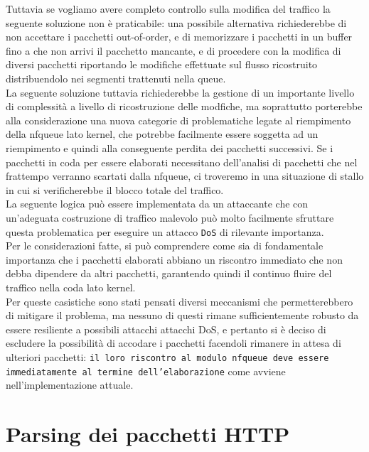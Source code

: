 Tuttavia se vogliamo avere completo controllo sulla modifica del traffico la seguente soluzione non è praticabile: una possibile alternativa richiederebbe
di non accettare i pacchetti out-of-order, e di memorizzare i pacchetti in un buffer fino a che non arrivi il pacchetto mancante, e di procedere con la modifica
di diversi pacchetti riportando le modifiche effettuate sul flusso ricostruito distribuendolo nei segmenti trattenuti nella queue.\\
La seguente soluzione tuttavia richiederebbe la gestione di un importante livello di complessità a livello di ricostruzione delle modfiche, ma soprattutto
porterebbe alla considerazione una nuova categorie di problematiche legate al riempimento della nfqueue lato kernel, che potrebbe facilmente essere soggetta
ad un riempimento e quindi alla conseguente perdita dei pacchetti successivi. Se i pacchetti in coda per essere elaborati necessitano dell'analisi di pacchetti che nel
frattempo verranno scartati dalla nfqueue, ci troveremo in una situazione di stallo in cui si verificherebbe il blocco totale del traffico.\\
La seguente logica può essere implementata da un attaccante che con un'adeguata costruzione di traffico malevolo può molto facilmente
sfruttare questa problematica per eseguire un attacco \texttt{DoS} di rilevante importanza.\\
Per le considerazioni fatte, si può comprendere come sia di fondamentale importanza che i pacchetti elaborati abbiano un riscontro immediato che non
debba dipendere da altri pacchetti, garantendo quindi il continuo fluire del traffico nella coda lato kernel.\\

Per queste casistiche sono stati pensati diversi meccanismi che permetterebbero di mitigare il problema, ma nessuno di questi rimane
sufficientemente robusto da essere resiliente a possibili attacchi attacchi DoS, e pertanto si è deciso di escludere la possibilità
di accodare i pacchetti facendoli rimanere in attesa di ulteriori pacchetti: \texttt{il loro riscontro al modulo nfqueue deve essere immediatamente al termine dell'elaborazione}
come avviene nell'implementazione attuale.\\

\section{Parsing dei pacchetti HTTP}

